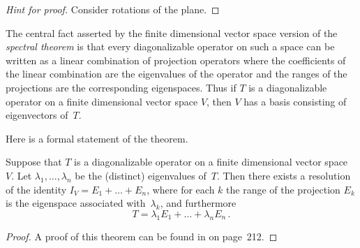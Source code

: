 \begin{proof}[\emph{Hint for proof}] Consider rotations of the plane.  \ns
\end{proof}

The central fact asserted by the finite dimensional vector space version of the
\emph{spectral theorem} is that every diagonalizable operator on such a space can be
written as a linear combination of projection operators where the coefficients of the
linear combination are the eigenvalues of the operator and the ranges of the projections
are the corresponding eigenspaces.  Thus if $T$ is a diagonalizable operator on a finite
dimensional vector space $V$, then $V$ has a basis consisting of eigenvectors of~$T$.

Here is a formal statement of the theorem.

\begin{thm} Suppose that $T$ is a
diagonalizable operator on a finite dimensional vector space~$V$.  Let $\lambda_1, \dots, \lambda_n$ be
the (distinct) eigenvalues of~$T$. Then there exists a resolution of the identity $I_V =
E_1 + \dots + E_n$, where for each $k$ the range of the projection $E_k$ is the
eigenspace associated with~$\lambda_k$, and furthermore
     \[ T = \lambda_1E_1 +\dots + \lambda_nE_n\,. \]
\end{thm}

\begin{proof} A proof of this theorem can be found in \cite{HoffmanK:1971} on page~212. \ns
\end{proof}

